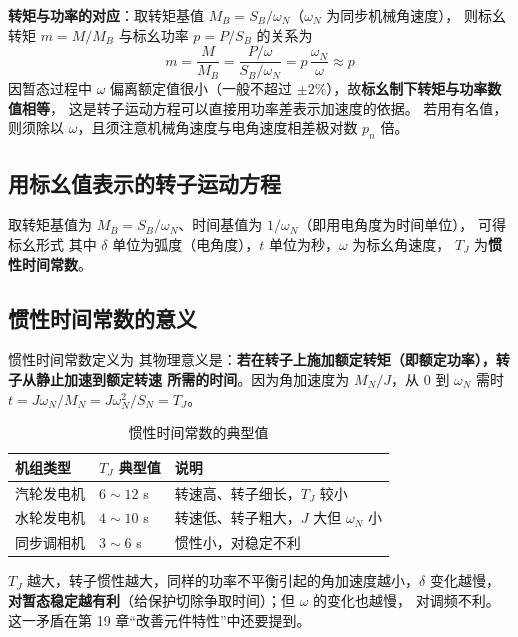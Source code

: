 \textbf{转矩与功率的对应}：取转矩基值 $M_B=S_B/\omega_N$（$\omega_N$ 为同步机械角速度），
则标幺转矩 $m=M/M_B$ 与标幺功率 $p=P/S_B$ 的关系为
\begin{equation}
  m=\frac{M}{M_B}=\frac{P/\omega}{S_B/\omega_N}=p\,\frac{\omega_N}{\omega}\approx p
\end{equation}
因暂态过程中 $\omega$ 偏离额定值很小（一般不超过 $\pm2\%$），故\textbf{标幺制下转矩与功率数值相等}，
这是转子运动方程可以直接用功率差表示加速度的依据。
若用有名值，则须除以 $\omega$，且须注意机械角速度与电角速度相差极对数 $p_n$ 倍。

\subsection{用标幺值表示的转子运动方程}

取转矩基值为 $M_B=S_B/\omega_N$、时间基值为 $1/\omega_N$（即用电角度为时间单位），
可得标幺形式
其中 $\delta$ 单位为弧度（电角度），$t$ 单位为秒，$\omega$ 为标幺角速度，
$T_J$ 为\textbf{惯性时间常数}。

\subsection{惯性时间常数的意义}

惯性时间常数定义为
其物理意义是：\textbf{若在转子上施加额定转矩（即额定功率），转子从静止加速到额定转速
所需的时间}。因为角加速度为 $M_N/J$，从 $0$ 到 $\omega_N$ 需时
$t=J\omega_N/M_N=J\omega_N^{2}/S_N=T_J$。

\begin{table}[htbp]
  \centering
  \caption{惯性时间常数的典型值}
  \small
  \begin{tabular}{@{}lll@{}}
    \toprule
    机组类型 & $T_J$ 典型值 & 说明 \\
    \midrule
    汽轮发电机 & $6\sim12$ s & 转速高、转子细长，$T_J$ 较小 \\
    水轮发电机 & $4\sim10$ s & 转速低、转子粗大，$J$ 大但 $\omega_N$ 小 \\
    同步调相机 & $3\sim6$ s & 惯性小，对稳定不利 \\
    \bottomrule
  \end{tabular}
\end{table}

$T_J$ 越大，转子惯性越大，同样的功率不平衡引起的角加速度越小，$\delta$ 变化越慢，
\textbf{对暂态稳定越有利}（给保护切除争取时间）；但 $\omega$ 的变化也越慢，
对调频不利。这一矛盾在第 19 章“改善元件特性”中还要提到。


